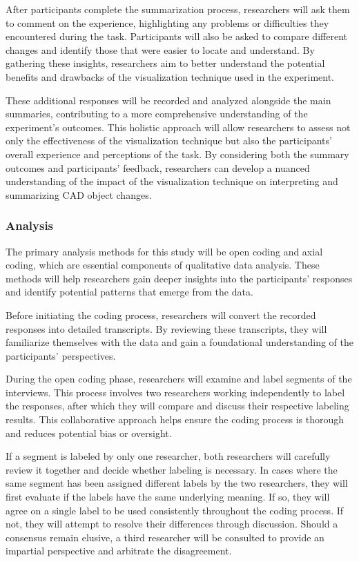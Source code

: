 \documentclass[sigconf,authorversion,nonacm]{acmart}
\begin{document}
After participants complete the summarization process, researchers will ask them to comment on the experience, highlighting any problems or difficulties they encountered during the task.
Participants will also be asked to compare different changes and identify those that were easier to locate and understand.
By gathering these insights, researchers aim to better understand the potential benefits and drawbacks of the visualization technique used in the experiment.

These additional responses will be recorded and analyzed alongside the main summaries, contributing to a more comprehensive understanding of the experiment's outcomes.
This holistic approach will allow researchers to assess not only the effectiveness of the visualization technique but also the participants' overall experience and perceptions of the task.
By considering both the summary outcomes and participants' feedback, researchers can develop a nuanced understanding of the impact of the visualization technique on interpreting and summarizing CAD object changes.


\subsubsection{Analysis}
The primary analysis methods for this study will be open coding and axial coding, which are essential components of qualitative data analysis. These methods will help researchers gain deeper insights into the participants' responses and identify potential patterns that emerge from the data.

Before initiating the coding process, researchers will convert the recorded responses into detailed transcripts. By reviewing these transcripts, they will familiarize themselves with the data and gain a foundational understanding of the participants' perspectives.

During the open coding phase, researchers will examine and label segments of the interviews. This process involves two researchers working independently to label the responses, after which they will compare and discuss their respective labeling results.
This collaborative approach helps ensure the coding process is thorough and reduces potential bias or oversight.

If a segment is labeled by only one researcher, both researchers will carefully review it together and decide whether labeling is necessary. In cases where the same segment has been assigned different labels by the two researchers,
they will first evaluate if the labels have the same underlying meaning. If so, they will agree on a single label to be used consistently throughout the coding process.
If not, they will attempt to resolve their differences through discussion. Should a consensus remain elusive, a third researcher will be consulted to provide an impartial perspective and arbitrate the disagreement.
\end{document}
